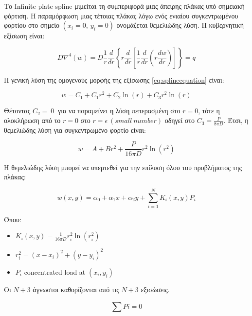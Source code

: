 Το \textlatin{Infinite plate spline} μιμείται τη συμπεριφορά μιας άπειρης πλάκας υπό σημειακή φόρτιση. Η παραμόρφωση μιας τέτοιας πλάκας λόγω ενός ενιαίου συγκεντρωμένου φορτίου στο σημείο $\left( x_{i} = 0,\ y_{i} = 0 \right)$ ονομάζεται θεμελιώδης λύση. Η κυβερνητική εξίσωση είναι:



\begin{equation}
D\nabla^{4}(w) = D\frac{1}{r}\frac{d}{dr}\left\{ r\frac{d}{dr}\left\lbrack \frac{1}{r}\frac{d}{dr}\left( r\frac{dw}{dr} \right) \right\rbrack \right\} = q
\label{eq:splineequation}
\end{equation}

Η γενική λύση της ομογενούς μορφής της εξίσωσης \ref{eq:splineequation} είναι:

\begin{equation}
   w = C_{1} + C_{1}r^{2} + C_{2}\ln(r) + C_{3}r^{2}\ln(r) 
\end{equation}

Θέτοντας $C_{2} = \ 0\ $ για να παραμείνει η λύση πεπερασμένη στο $r = 0$, τότε η ολοκλήρωση από το $r = 0$ στο $r = \epsilon\ (small\ number)$ οδηγεί στο $C_{3} = \frac{P}{8\pi D}$. Έτσι, η θεμελιώδης λύση για συγκεντρωμένο φορτίο είναι:

\begin{equation} w = A + Br^{2} + \frac{P}{16\pi D}r^{2}\ln\left( r^{2} \right) \end{equation}

Η θεμελιώδης λύση μπορεί να υπερτεθεί για την επίλυση όλου του προβλήματος της πλάκας:

\begin{equation} w(x,y) = \alpha_{0} + \alpha_{1}x + \alpha_{2}y + \sum_{i = 1}^{N}{K_{i}(x,y)P_{i}} \end{equation}

Όπου:

\begin{itemize}
\item
  $K_{i}(x,y) = \frac{1}{16\pi D}r_{i}^{2}\ln\left( r_{i}^{2} \right)$
\item
  $r_{i}^{2} = \left( x - x_{i} \right)^{2} + \left( y - y_{i} \right)^{2}$
\item
  $P_{i}$ \textlatin{concentrated load at} $\left( x_{i},y_{i} \right)$
\end{itemize}

Οι $N+3$ άγνωστοι καθορίζονται από τις $N+3$ εξισώσεις.

\begin{equation}
\sum_{}^{}{Pi} = 0
\end{equation}

